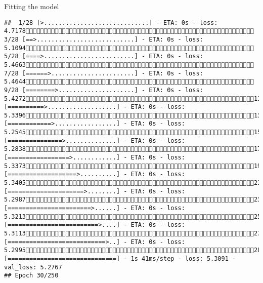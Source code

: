 \documentclass[
  ignorenonframetext,
]{beamer}
\begin{document}
\begin{frame}[fragile]{Fitting the model}
\begin{verbatim}
##  1/28 [>.............................] - ETA: 0s - loss: 4.7178 3/28 [==>...........................] - ETA: 0s - loss: 5.1094 5/28 [====>.........................] - ETA: 0s - loss: 5.4663 7/28 [======>.......................] - ETA: 0s - loss: 5.4644 9/28 [========>.....................] - ETA: 0s - loss: 5.427211/28 [==========>...................] - ETA: 0s - loss: 5.339613/28 [============>.................] - ETA: 0s - loss: 5.254515/28 [===============>..............] - ETA: 0s - loss: 5.283817/28 [=================>............] - ETA: 0s - loss: 5.337319/28 [===================>..........] - ETA: 0s - loss: 5.340521/28 [=====================>........] - ETA: 0s - loss: 5.298723/28 [=======================>......] - ETA: 0s - loss: 5.321325/28 [=========================>....] - ETA: 0s - loss: 5.311327/28 [===========================>..] - ETA: 0s - loss: 5.299528/28 [==============================] - 1s 41ms/step - loss: 5.3091 - val_loss: 5.2767
## Epoch 30/250

\end{verbatim}
\end{frame}
\end{document}
